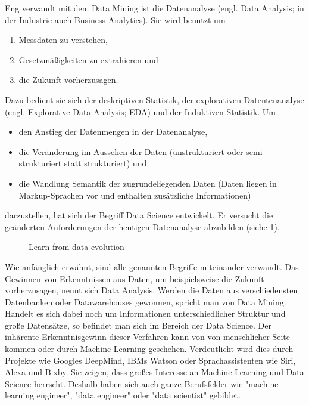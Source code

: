 Eng verwandt mit dem Data Mining ist die Datenanalyse (engl. Data Analysis; in der Industrie auch Business Analytics\citep[S.~58]{swamynathan_mastering_2017}). Sie wird benutzt um\citep[S.~2; Teil 1]{hertle_datenanalyse_2016}
\begin{enumerate}
\item Messdaten zu verstehen,
\item Gesetzmäßigkeiten zu extrahieren und
\item die Zukunft vorherzusagen.
\end{enumerate}
Dazu bedient sie sich der deskriptiven Statistik, der explorativen Datentenanalyse (engl. Explorative Data Analysis; EDA) und der Induktiven Statistik.\citep[S.~17]{hertle_datenanalyse_2016}\newline
Um 
\begin{itemize}
\item den Anstieg der Datenmengen in der Datenanalyse,
\item die Veränderung im Aussehen der Daten (unstrukturiert oder semi-strukturiert statt strukturiert) und
\item die Wandlung Semantik der zugrundeliegenden Daten (Daten liegen in Markup-Sprachen vor und enthalten zusätzliche Informationen)
\end{itemize}
darzustellen, hat sich der Begriff Data Science entwickelt.\citep{dhar_data_2013} Er versucht die geänderten Anforderungen der heutigen Datenanalyse abzubilden (siehe \ref{fig:dataEvolution}).

\begin{figure}[H]
\centering
{}
\caption{Learn from data evolution \citep[S.~66]{swamynathan_mastering_2017}}
\label{fig:dataEvolution}
\end{figure}
Wie anfänglich erwähnt, sind alle genannten Begriffe miteinander verwandt. Das Gewinnen von Erkenntnissen aus Daten, um beispielsweise die Zukunft vorherzusagen, nennt sich Data Analysis. Werden die Daten aus verschiedensten Datenbanken oder Datawarehouses gewonnen, spricht man von Data Mining. Handelt es sich dabei noch um Informationen unterschiedlicher Struktur und große Datensätze, so befindet man sich im Bereich der Data Science. Der inhärente Erkenntnisgewinn dieser Verfahren kann von von menschlicher Seite kommen oder durch Machine Learning geschehen.\newline
Verdeutlicht wird dies durch Projekte wie Googles DeepMind\citep{deepmind_technologies_limited_deepmind_2017}, IBMs Watson\citep{international_business_machines_corporation_ibm_ibm_2017} oder Sprachassistenten wie Siri, Alexa und Bixby. Sie zeigen, dass großes Interesse an Machine Learning und Data Science herrscht. Deshalb haben sich auch ganze Berufsfelder wie "machine learning engineer", "data engineer" oder "data scientist"\citep[S.~1]{ramasubramanian_machine_2017} gebildet.


